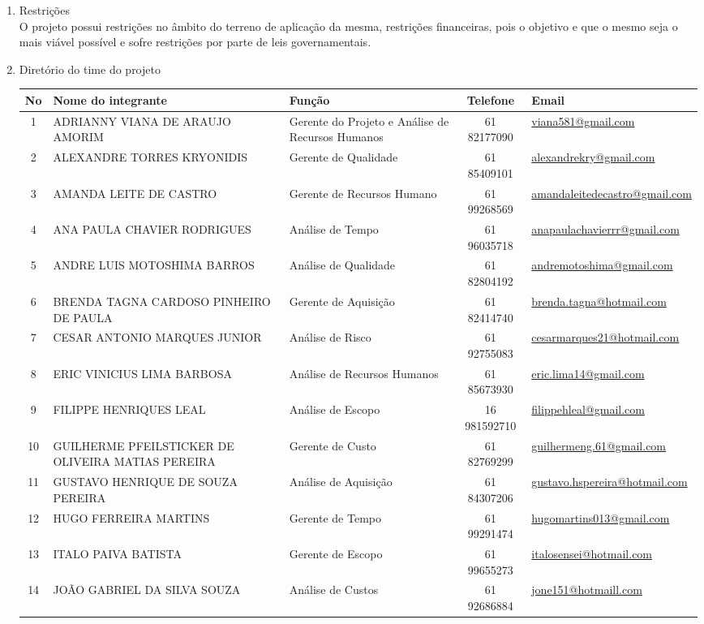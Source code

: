 \begin{enumerate}
\item Restrições\\
O projeto possui restrições no âmbito do terreno de aplicação da mesma, restrições financeiras, pois o objetivo e que o mesmo seja o mais viável possível e sofre restrições por parte de leis governamentais.

\item Diretório do time do projeto
\begin{table}[h]
\begin{tabular}{|c|p{4cm}|p{4cm}|c|p{4cm}|}
No & Nome do integrante & Função & Telefone & Email\\ \hline
1&ADRIANNY VIANA DE ARAUJO AMORIM&Gerente do Projeto e Análise de Recursos Humanos&61 82177090&\url{viana581@gmail.com}\\ \hline
2&ALEXANDRE TORRES KRYONIDIS&Gerente de Qualidade&61 85409101&\url{alexandrekry@gmail.com}\\ \hline
3&AMANDA LEITE DE CASTRO&Gerente de Recursos Humano&61 99268569&\url{amandaleitedecastro@gmail.com}\\ \hline
4&ANA PAULA CHAVIER RODRIGUES&Análise de Tempo&61 96035718&\url{anapaulachavierrr@gmail.com}\\ \hline
5&ANDRE LUIS MOTOSHIMA BARROS&Análise de Qualidade&61 82804192&\url{andremotoshima@gmail.com}\\ \hline
6&BRENDA TAGNA CARDOSO PINHEIRO DE PAULA&Gerente de Aquisição&61 82414740&\url{brenda.tagna@hotmail.com} \\ \hline
7&CESAR ANTONIO MARQUES JUNIOR&Análise de Risco&61 92755083&\url{cesarmarques21@hotmail.com} \\ \hline
8&ERIC VINICIUS LIMA BARBOSA&Análise de Recursos Humanos&61 85673930&\url{eric.lima14@gmail.com} \\ \hline
9&FILIPPE HENRIQUES LEAL&Análise de Escopo&16 981592710&\url{filippehleal@gmail.com} \\ \hline
10&GUILHERME PFEILSTICKER DE OLIVEIRA MATIAS PEREIRA&Gerente de Custo&61 82769299&\url{guilhermeng.61@gmail.com} \\ \hline
11&GUSTAVO HENRIQUE DE SOUZA PEREIRA&Análise de Aquisição&61 84307206&\url{gustavo.hspereira@hotmail.com} \\ \hline
12&HUGO FERREIRA MARTINS&Gerente de Tempo&61 99291474&\url{hugomartins013@gmail.com}\\ \hline
13&ITALO PAIVA BATISTA&Gerente de Escopo&61 99655273&\url{italosensei@hotmail.com}\\ \hline
14&JOÃO GABRIEL DA SILVA SOUZA&Análise de Custos&61 92686884&\url{jone151@hotmaill.com}\\ \hline

\end{tabular}
\end{table}
\end{enumerate}
